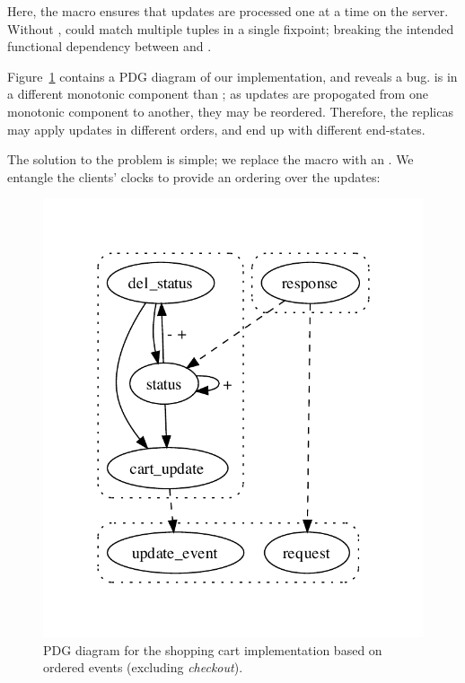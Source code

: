 Here, the  macro ensures that updates are
processed one at a time on the server.  Without ,
 could match multiple tuples in a single fixpoint;
breaking the intended functional dependency between 
and .


Figure~\ref{fig:cs-pdg-2} contains a PDG diagram of our
implementation, and reveals a bug.   is in a
different monotonic component than ; as updates
are propogated from one monotonic component to another, they may be
reordered.  Therefore, the replicas may apply updates in different
orders, and end up with different end-states.

The solution to the problem is simple; we replace the  macro with an .  We entangle the clients' clocks to provide an ordering over the updates:


\begin{figure}[t]
\centering
\includegraphics[width=0.65\linewidth]{vizza_straw.pdf}
\caption{PDG diagram for the shopping cart implementation based on ordered events (excluding {\em checkout}).}
\label{fig:cs-pdg-2}
\end{figure}

